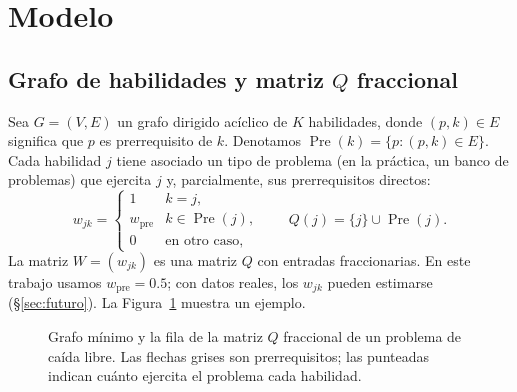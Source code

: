 \documentclass[11pt]{article}
\theoremstyle{definition}
\theoremstyle{remark}
\newcommand{\Pre}{\operatorname{Pre}}
\begin{document}
\section{Modelo}
\label{sec:modelo}

\subsection{Grafo de habilidades y matriz \texorpdfstring{$Q$}{Q} fraccional}

Sea $G=(V,E)$ un grafo dirigido acíclico de $K$ habilidades, donde $(p,k)\in E$ significa que $p$ es prerrequisito de $k$. Denotamos $\Pre(k)=\{p:(p,k)\in E\}$. Cada habilidad $j$ tiene asociado un tipo de problema (en la práctica, un banco de problemas) que ejercita $j$ y, parcialmente, sus prerrequisitos directos:
\begin{equation}
w_{jk}=\begin{cases}1 & k=j,\\ w_{\mathrm{pre}} & k\in\Pre(j),\\ 0 & \text{en otro caso,}\end{cases}
\qquad Q(j)=\{j\}\cup\Pre(j).
\label{eq:pesos}
\end{equation}
La matriz $W=(w_{jk})$ es una matriz $Q$ con entradas fraccionarias. En este trabajo usamos $w_{\mathrm{pre}}=0.5$; con datos reales, los $w_{jk}$ pueden estimarse (\S\ref{sec:futuro}). La Figura~\ref{fig:grafo-ejemplo} muestra un ejemplo.

\begin{figure}[t]
\centering
{}
\caption{Grafo mínimo y la fila de la matriz $Q$ fraccional de un problema de caída libre. Las flechas grises son prerrequisitos; las punteadas indican cuánto ejercita el problema cada habilidad.}
\label{fig:grafo-ejemplo}
\end{figure}
\end{document}
